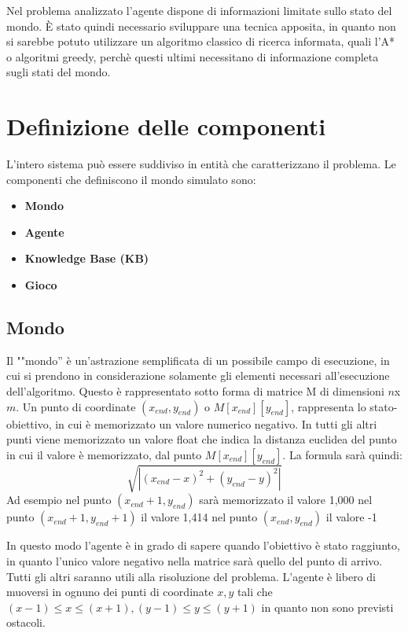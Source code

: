Nel problema analizzato l'agente dispone di informazioni limitate sullo stato del mondo. È stato quindi necessario sviluppare una tecnica apposita, in quanto non si sarebbe potuto utilizzare un algoritmo classico di ricerca informata, quali l'A* o algoritmi greedy, perchè questi ultimi necessitano di informazione completa sugli stati del mondo.


\section{Definizione delle componenti}
L'intero sistema può essere suddiviso in entità che caratterizzano il problema. 
Le componenti che definiscono il mondo simulato sono:
\begin{itemize}
\item \textbf{Mondo}

\item \textbf{Agente}

\item \textbf{Knowledge Base (KB)}

\item \textbf{Gioco} 	
\end{itemize}

\subsection{Mondo}
Il ""mondo'' è un'astrazione semplificata di un possibile campo di esecuzione, in cui si prendono in considerazione solamente gli elementi necessari all'esecuzione dell'algoritmo. Questo è rappresentato sotto forma di matrice M di dimensioni $n$x$m$. Un punto di coordinate $(x_{end}, y_{end})$ o $M[x_{end}][y_{end}]$, rappresenta lo stato-obiettivo, in cui è memorizzato un valore numerico negativo. In tutti gli altri punti viene memorizzato un valore float che indica la distanza euclidea del punto in cui il valore è memorizzato, dal punto $M[x_{end}][y_{end}]$. La formula sarà quindi:
$$\sqrt{|(x_{end} - x)^2 + (y_{end} - y)^2|}$$
Ad esempio nel punto $(x_{end}+1, y_{end})$ sarà memorizzato il valore 1,000 nel punto $(x_{end}+1, y_{end}+1)$ il valore 1,414 nel punto $(x_{end}, y_{end})$ il valore -1 

In questo modo l'agente è in grado di sapere quando l'obiettivo è stato raggiunto, in quanto l'unico valore negativo nella matrice sarà quello del punto di arrivo. Tutti gli altri saranno utili alla risoluzione del problema.
L'agente è libero di muoversi in ognuno dei punti di coordinate $ x, y $ tali che $ (x-1) \le x \le (x+1), (y-1) \le y \le (y+1) $ in quanto non sono previsti ostacoli.


